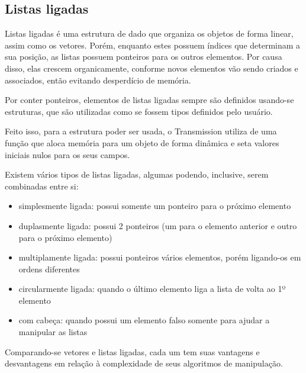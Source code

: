 
\newpage
\subsection*{Listas ligadas}

Listas ligadas é uma estrutura de dado que organiza os objetos de forma linear, assim
como os vetores. Porém, enquanto estes possuem índices que determinam a sua posição, as
listas possuem ponteiros para os outros elementos. Por causa disso, elas crescem
organicamente, conforme novos elementos vão sendo criados e associados, então evitando
desperdício de memória.

Por conter ponteiros, elementos de listas ligadas sempre são definidos usando-se
estruturas, que são utilizadas como se fossem tipos definidos pelo usuário.


Feito isso, para a estrutura poder ser usada, o Transmission utiliza de uma função que
aloca memória para um objeto de forma dinâmica e seta valores iniciais nulos para os
seus campos.


Existem vários tipos de listas ligadas, algumas podendo, inclusive, serem combinadas
entre si:

\begin{itemize}
    \item simplesmente ligada: possui somente um ponteiro para o próximo elemento
    \item duplasmente ligada: possui 2 ponteiros (um para o elemento anterior e outro
        para o próximo elemento)
    \item multiplamente ligada: possui ponteiros vários elementos, porém ligando-os em
        ordens diferentes
    \item circularmente ligada: quando o último elemento liga a lista de volta ao
        1º elemento
    \item com cabeça: quando possui um elemento falso somente para ajudar a manipular as
        listas
\end{itemize}

Comparando-se vetores e listas ligadas, cada um tem suas vantagens e desvantagens em
relação à complexidade de seus algoritmos de manipulação.

